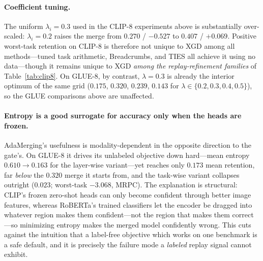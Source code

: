 \documentclass{article} %
\begin{document}
\paragraph{Coefficient tuning.}
The uniform $\lambda_i=0.3$ used in the CLIP-8 experiments above is substantially over-scaled: $\lambda_i=0.2$ raises the merge from $0.270$ / $-0.527$ to $0.407$ / $+0.069$. Positive worst-task retention on CLIP-8 is therefore not unique to XGD among all methods---tuned task arithmetic, Breadcrumbs, and TIES all achieve it using no data---though it remains unique to XGD \emph{among the replay-refinement families} of Table~\ref{tab:clip8}. On GLUE-8, by contrast, $\lambda=0.3$ is already the interior optimum of the same grid ($0.175$, $\mathbf{0.320}$, $0.239$, $0.143$ for $\lambda\in\{0.2,0.3,0.4,0.5\}$), so the GLUE comparisons above are unaffected.

\paragraph{Entropy is a good surrogate for accuracy only when the heads are frozen.}
AdaMerging's usefulness is modality-dependent in the opposite direction to the gate's. On GLUE-8 it drives its unlabeled objective down hard---mean entropy $0.610\to0.163$ for the layer-wise variant---yet reaches only $0.173$ mean retention, far \emph{below} the $0.320$ merge it starts from, and the task-wise variant collapses outright ($0.023$; worst-task $-3.068$, MRPC). The explanation is structural: CLIP's frozen zero-shot heads can only become confident through better image features, whereas RoBERTa's trained classifiers let the encoder be dragged into whatever region makes them confident---not the region that makes them correct---so minimizing entropy makes the merged model confidently wrong. This cuts against the intuition that a label-free objective which works on one benchmark is a safe default, and it is precisely the failure mode a \emph{labeled} replay signal cannot exhibit.
\end{document}
